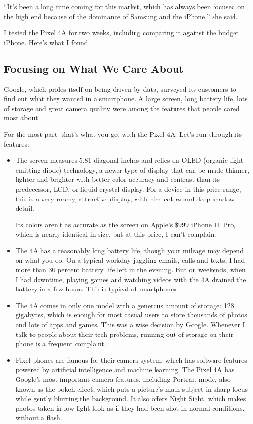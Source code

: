 ``It's been a long time coming for this market, which has always been
focused on the high end because of the dominance of Samsung and the
iPhone,'' she said.

I tested the Pixel 4A for two weeks, including comparing it against the
budget iPhone. Here's what I found.

\hypertarget{focusing-on-what-we-care-about}{%
\subsection{Focusing on What We Care
About}\label{focusing-on-what-we-care-about}}

Google, which prides itself on being driven by data, surveyed its
customers to find out
\href{https://www.statista.com/chart/5995/the-most-wanted-smartphone-features/}{what
they wanted in a smartphone}. A large screen, long battery life, lots of
storage and great camera quality were among the features that people
cared most about.

For the most part, that's what you get with the Pixel 4A. Let's run
through its features:

\begin{itemize}
\item
  The screen measures 5.81 diagonal inches and relies on OLED (organic
  light-emitting diode) technology, a newer type of display that can be
  made thinner, lighter and brighter with better color accuracy and
  contrast than its predecessor, LCD, or liquid crystal display. For a
  device in this price range, this is a very roomy, attractive display,
  with nice colors and deep shadow detail.

  Its colors aren't as accurate as the screen on Apple's \$999 iPhone 11
  Pro, which is nearly identical in size, but at this price, I can't
  complain.
\item
  The 4A has a reasonably long battery life, though your mileage may
  depend on what you do. On a typical workday juggling emails, calls and
  texts, I had more than 30 percent battery life left in the evening.
  But on weekends, when I had downtime, playing games and watching
  videos with the 4A drained the battery in a few hours. This is typical
  of smartphones.
\item
  The 4A comes in only one model with a generous amount of storage: 128
  gigabytes, which is enough for most casual users to store thousands of
  photos and lots of apps and games. This was a wise decision by Google.
  Whenever I talk to people about their tech problems, running out of
  storage on their phone is a frequent complaint.
\item
  Pixel phones are famous for their camera system, which has software
  features powered by artificial intelligence and machine learning. The
  Pixel 4A has Google's most important camera features, including
  Portrait mode, also known as the bokeh effect, which puts a picture's
  main subject in sharp focus while gently blurring the background. It
  also offers Night Sight, which makes photos taken in low light look as
  if they had been shot in normal conditions, without a flash.
\end{itemize}

